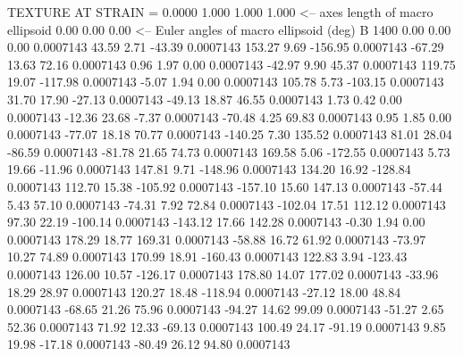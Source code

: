 TEXTURE AT STRAIN =    0.0000
   1.000   1.000   1.000  <-- axes length of macro ellipsoid
    0.00    0.00    0.00  <-- Euler angles of macro ellipsoid (deg)
B      1400
        0.00        0.00        0.00     0.0007143
       43.59        2.71      -43.39     0.0007143
      153.27        9.69     -156.95     0.0007143
      -67.29       13.63       72.16     0.0007143
        0.96        1.97        0.00     0.0007143
      -42.97        9.90       45.37     0.0007143
      119.75       19.07     -117.98     0.0007143
       -5.07        1.94        0.00     0.0007143
      105.78        5.73     -103.15     0.0007143
       31.70       17.90      -27.13     0.0007143
      -49.13       18.87       46.55     0.0007143
        1.73        0.42        0.00     0.0007143
      -12.36       23.68       -7.37     0.0007143
      -70.48        4.25       69.83     0.0007143
        0.95        1.85        0.00     0.0007143
      -77.07       18.18       70.77     0.0007143
     -140.25        7.30      135.52     0.0007143
       81.01       28.04      -86.59     0.0007143
      -81.78       21.65       74.73     0.0007143
      169.58        5.06     -172.55     0.0007143
        5.73       19.66      -11.96     0.0007143
      147.81        9.71     -148.96     0.0007143
      134.20       16.92     -128.84     0.0007143
      112.70       15.38     -105.92     0.0007143
     -157.10       15.60      147.13     0.0007143
      -57.44        5.43       57.10     0.0007143
      -74.31        7.92       72.84     0.0007143
     -102.04       17.51      112.12     0.0007143
       97.30       22.19     -100.14     0.0007143
     -143.12       17.66      142.28     0.0007143
       -0.30        1.94        0.00     0.0007143
      178.29       18.77      169.31     0.0007143
      -58.88       16.72       61.92     0.0007143
      -73.97       10.27       74.89     0.0007143
      170.99       18.91     -160.43     0.0007143
      122.83        3.94     -123.43     0.0007143
      126.00       10.57     -126.17     0.0007143
      178.80       14.07      177.02     0.0007143
      -33.96       18.29       28.97     0.0007143
      120.27       18.48     -118.94     0.0007143
      -27.12       18.00       48.84     0.0007143
      -68.65       21.26       75.96     0.0007143
      -94.27       14.62       99.09     0.0007143
      -51.27        2.65       52.36     0.0007143
       71.92       12.33      -69.13     0.0007143
      100.49       24.17      -91.19     0.0007143
        9.85       19.98      -17.18     0.0007143
      -80.49       26.12       94.80     0.0007143
